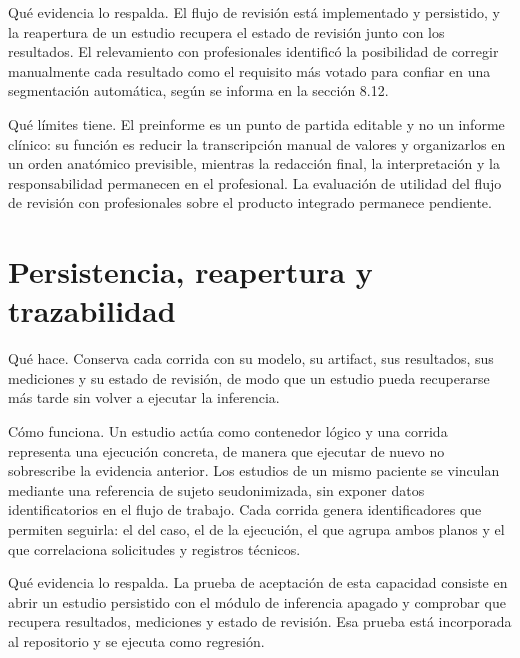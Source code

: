 
Qué evidencia lo respalda. El flujo de revisión está implementado y persistido, y la reapertura de un estudio recupera el estado de revisión junto con los resultados. El relevamiento con profesionales identificó la posibilidad de corregir manualmente cada resultado como el requisito más votado para confiar en una segmentación automática, según se informa en la sección 8.12.

Qué límites tiene. El preinforme es un punto de partida editable y no un informe clínico: su función es reducir la transcripción manual de valores y organizarlos en un orden anatómico previsible, mientras la redacción final, la interpretación y la responsabilidad permanecen en el profesional. La evaluación de utilidad del flujo de revisión con profesionales sobre el producto integrado permanece pendiente.

\section{Persistencia, reapertura y trazabilidad}

Qué hace. Conserva cada corrida con su modelo, su artifact, sus resultados, sus mediciones y su estado de revisión, de modo que un estudio pueda recuperarse más tarde sin volver a ejecutar la inferencia.

Cómo funciona. Un estudio actúa como contenedor lógico y una corrida representa una ejecución concreta, de manera que ejecutar de nuevo no sobrescribe la evidencia anterior. Los estudios de un mismo paciente se vinculan mediante una referencia de sujeto seudonimizada, sin exponer datos identificatorios en el flujo de trabajo. Cada corrida genera identificadores que permiten seguirla: el del caso, el de la ejecución, el que agrupa ambos planos y el que correlaciona solicitudes y registros técnicos.


Qué evidencia lo respalda. La prueba de aceptación de esta capacidad consiste en abrir un estudio persistido con el módulo de inferencia apagado y comprobar que recupera resultados, mediciones y estado de revisión. Esa prueba está incorporada al repositorio y se ejecuta como regresión.

